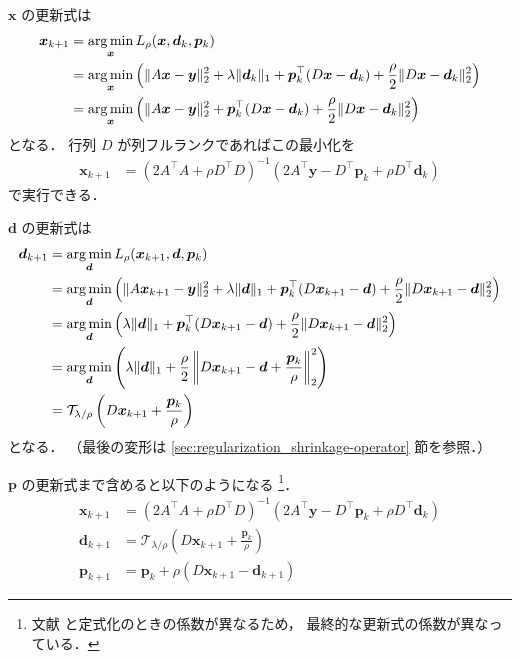 $\bm{x}$ の更新式は
\begin{align}
    \bm{x}_{k+1}
     & = \operatorname*{arg \thinspace min}_{\bm{x}} L_{\rho}(\bm{x}, \bm{d}_k, \bm{p}_k)
    \notag                                                                          \\
     & = \operatorname*{arg \thinspace min}_{\bm{x}} \left( \|A \bm{x} - \bm{y}\|_2^2 + \lambda \|\bm{d}_k\|_1
    + \bm{p}_k^\top (D \bm{x} - \bm{d}_k)
    + \frac{\rho}{2} \|D \bm{x} - \bm{d}_k\|_2^2 \right)
    \notag                                                                          \\
     & = \operatorname*{arg \thinspace min}_{\bm{x}} \left( \|A \bm{x} - \bm{y}\|_2^2
    + \bm{p}_k^\top (D \bm{x} - \bm{d}_k)
    + \frac{\rho}{2} \|D \bm{x} - \bm{d}_k\|_2^2 \right)
\end{align}
となる．
行列 $D$ が列フルランクであればこの最小化を
\begin{align}
    \bm{x}_{k+1}
     & = (2 A^\top A + \rho D^\top D)^{-1} (2 A^\top \bm{y} - D^\top \bm{p}_k + \rho D^\top \bm{d}_k)
\end{align}
で実行できる．

$\bm{d}$ の更新式は
\begin{align}
    \bm{d}_{k+1}
     & = \operatorname*{arg \thinspace min}_{\bm{d}} L_{\rho}(\bm{x}_{k+1}, \bm{d}, \bm{p}_k)
    \notag                                                                                \\
     & = \operatorname*{arg \thinspace min}_{\bm{d}} \left( \|A \bm{x}_{k+1} - \bm{y}\|_2^2 + \lambda \|\bm{d}\|_1
    + \bm{p}_k^\top (D \bm{x}_{k+1} - \bm{d})
    + \frac{\rho}{2} \|D \bm{x}_{k+1} - \bm{d}\|_2^2 \right)
    \notag                                                                                \\
     & = \operatorname*{arg \thinspace min}_{\bm{d}} \left( \lambda \|\bm{d}\|_1
    + \bm{p}_k^\top (D \bm{x}_{k+1} - \bm{d})
    + \frac{\rho}{2} \|D \bm{x}_{k+1} - \bm{d}\|_2^2 \right)
    \notag                                                                                \\
     & = \operatorname*{arg \thinspace min}_{\bm{d}} \left( \lambda \|\bm{d}\|_1
    + \frac{\rho}{2} \left\| D \bm{x}_{k+1} - \bm{d} + \frac{\bm{p}_k}{\rho} \right\|_2^2 \right)
    \notag                                                                                \\
     & = \mathcal{T}_{\lambda/\rho} \left( D \bm{x}_{k+1} + \frac{\bm{p}_k}{\rho} \right)
\end{align}
となる．
（最後の変形は \ref{sec:regularization_shrinkage-operator} 節を参照．）

$\bm{p}$ の更新式まで含めると以下のようになる
\footnote{文献 \cite{Boyd2010} と定式化のときの係数が異なるため，%
    最終的な更新式の係数が異なっている．}．
\begin{align}
    \bm{x}_{k+1}
     & = (2 A^\top A + \rho D^\top D)^{-1} (2 A^\top \bm{y} - D^\top \bm{p}_k + \rho D^\top \bm{d}_k)
    \\
    \bm{d}_{k+1}
     & = \mathcal{T}_{\lambda/\rho} \left( D \bm{x}_{k+1} + \frac{\bm{p}_k}{\rho} \right)
    \\
    \bm{p}_{k+1}
     & = \bm{p}_k + \rho (D \bm{x}_{k+1} -\bm{d}_{k+1})
\end{align}

